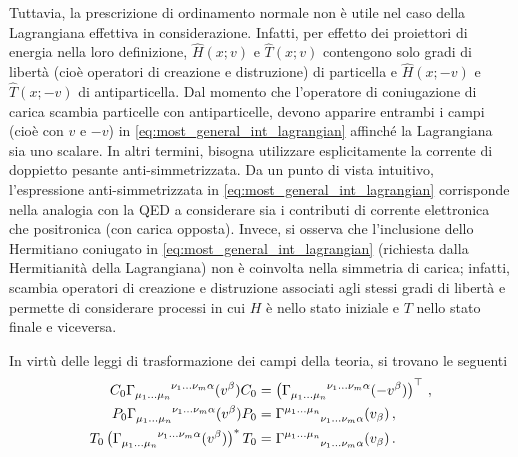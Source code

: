 \documentclass{article}
\begin{document}
Tuttavia, la prescrizione di ordinamento normale non è utile nel caso della Lagrangiana effettiva in considerazione. Infatti, per effetto dei proiettori di energia nella loro definizione, $\hat{H}(x;v)$ e $\hat{T}(x;v)$ contengono solo gradi di libertà (cioè operatori di creazione e distruzione) di particella e $\hat{H}(x;-v)$ e $\hat{T}(x;-v)$ di antiparticella. Dal momento che l'operatore di coniugazione di carica scambia particelle con antiparticelle, devono apparire entrambi i campi (cioè con $v$ e $-v$) in \eqref{eq:most_general_int_lagrangian} affinché la Lagrangiana sia uno scalare. In altri termini, bisogna utilizzare esplicitamente la corrente di doppietto pesante anti-simmetrizzata. Da un punto di vista intuitivo,  l'espressione anti-simmetrizzata in \eqref{eq:most_general_int_lagrangian} corrisponde nella analogia con la QED a considerare sia i contributi di corrente elettronica che positronica (con carica opposta). Invece, si osserva che l'inclusione dello Hermitiano coniugato in \eqref{eq:most_general_int_lagrangian} (richiesta dalla Hermitianità della Lagrangiana) non è coinvolta nella simmetria di carica; infatti, scambia operatori di creazione e distruzione associati agli stessi gradi di libertà e permette di considerare processi in cui $H$ è nello stato iniziale e $T$ nello stato finale e viceversa.

In virtù delle leggi di trasformazione dei campi della teoria, si trovano le seguenti
\begin{subequations}
\begin{align}
  C_0 \Gamma\indices{_{\mu_1 \dots \mu_n}^{\nu_1 \dots \nu_m \alpha}}(v^\beta) C_0 &= \left( \Gamma\indices{_{\mu_1 \dots \mu_n}^{\nu_1 \dots \nu_m \alpha}}(-v^\beta) \right)^\top \, , \\
  P_0 \Gamma\indices{_{\mu_1 \dots \mu_n}^{\nu_1 \dots \nu_m \alpha}}(v^\beta) P_0 &= \Gamma\indices{^{\mu_1 \dots \mu_n}_{\nu_1 \dots \nu_m \alpha}}(v_\beta) \, , \\
  T_0 \left( \Gamma\indices{_{\mu_1 \dots \mu_n}^{\nu_1 \dots \nu_m \alpha}}(v^\beta) \right)^* T_0 &= \Gamma\indices{^{\mu_1 \dots \mu_n}_{\nu_1 \dots \nu_m \alpha}}(v_\beta) \, .
\end{align}
\label{eq:CPT}
\end{subequations}
\end{document}
